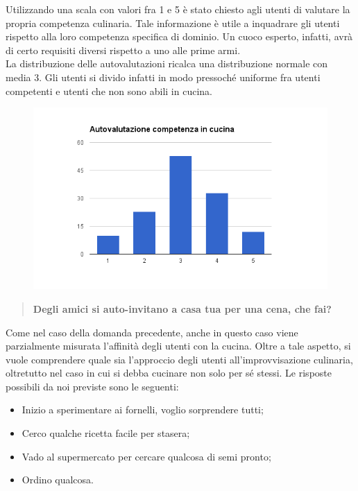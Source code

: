 Utilizzando una scala con valori fra 1 e 5 è stato chiesto agli utenti di valutare la propria competenza culinaria.
Tale informazione è utile a inquadrare gli utenti rispetto alla loro competenza specifica di dominio. Un cuoco esperto, infatti,
avrà di certo requisiti diversi rispetto a uno alle prime armi.
\\
La distribuzione delle autovalutazioni ricalca una distribuzione normale con media 3. Gli utenti si divido infatti in modo
pressoché uniforme fra utenti competenti e utenti che non sono abili in cucina.


\begin{figure}[H]
	\centering
	\includegraphics[scale=0.6]{img/chart_bravura_cucina}
\end{figure}

\begin{quote}
	\textbf{Degli amici si auto-invitano a casa tua per una cena, che fai?}
\end{quote}

Come nel caso della domanda precedente, anche in questo caso viene parzialmente misurata l'affinità degli utenti con la cucina.
Oltre a tale aspetto, si vuole comprendere quale sia l'approccio degli utenti all'improvvisazione culinaria, oltretutto
nel caso in cui si debba cucinare non solo per sé stessi. Le risposte possibili da noi previste sono le seguenti:
\begin{itemize}
 \item Inizio a sperimentare ai fornelli, voglio sorprendere tutti;
 \item Cerco qualche ricetta facile per stasera;
 \item Vado al supermercato per cercare qualcosa di semi pronto;
 \item Ordino qualcosa.
\end{itemize}

